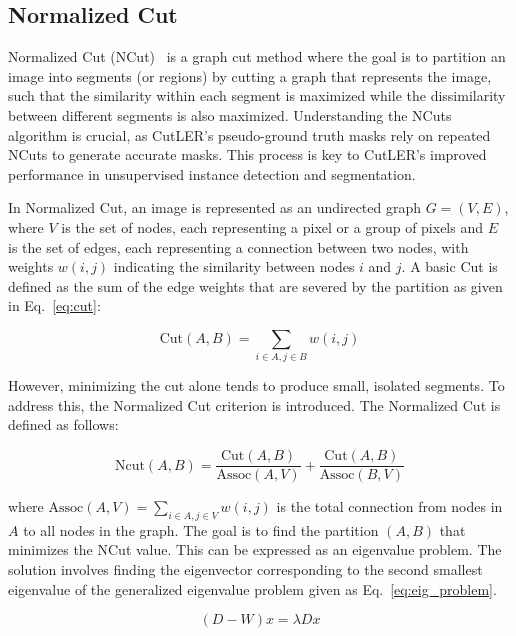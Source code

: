 \subsection{Normalized Cut}
Normalized Cut (NCut)~\cite{normcut} is a graph cut method where the goal is to partition an image into segments (or regions) by cutting a graph that represents the image, such that the similarity within each segment is maximized while the dissimilarity between different segments is also maximized. Understanding the NCuts algorithm is crucial, as CutLER's pseudo-ground truth masks rely on repeated NCuts to generate accurate masks. This process is key to CutLER's improved performance in unsupervised instance detection and segmentation.

In Normalized Cut, an image is represented as an undirected graph \( G = (V, E) \), where \( V \) is the set of nodes, each representing a pixel or a group of pixels and \( E \) is the set of edges, each representing a connection between two nodes, with weights \( w(i, j) \) indicating the similarity between nodes \( i \) and \( j \). A basic Cut is defined as the sum of the edge weights that are severed by the partition as given in Eq.~\ref{eq:cut}:

\begin{equation}
	\label{eq:cut}
	\text{Cut}(A, B) = \sum_{i \in A, j \in B} w(i, j)
\end{equation}

However, minimizing the cut alone tends to produce small, isolated segments. To address this, the Normalized Cut criterion is introduced. The Normalized Cut is defined as follows:

\begin{equation}
	\label{eq:norm_cut}
	\text{Ncut}(A, B) = \frac{\text{Cut}(A, B)}{\text{Assoc}(A, V)} + \frac{\text{Cut}(A, B)}{\text{Assoc}(B, V)}
\end{equation}

where \( \text{Assoc}(A, V) = \sum_{i \in A, j \in V} w(i, j) \) is the total connection from nodes in \( A \) to all nodes in the graph. The goal is to find the partition \( (A, B) \) that minimizes the NCut value. This can be expressed as an eigenvalue problem. The solution involves finding the eigenvector corresponding to the second smallest eigenvalue of the generalized eigenvalue problem given as Eq.~\ref{eq:eig_problem}.

\begin{equation}
	\label{eq:eig_problem}
	(D - W)x = \lambda D x
\end{equation}

